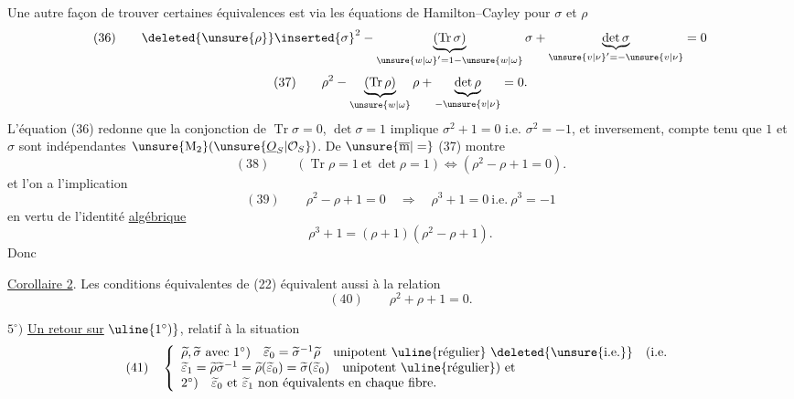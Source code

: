 Une autre façon de trouver certaines équivalences est via les équations de Hamilton--Cayley pour $\sigma$ et $\rho$
\[
(36)\qquad
\deleted{\unsure{\rho}}\inserted{\sigma}^2
-\underbrace{(\operatorname{Tr}\sigma)}_{\unsure{w|\omega}'=1-\unsure{w|\omega}}\sigma
+\underbrace{\det\sigma}_{\unsure{v|\nu}'=-\unsure{v|\nu}}=0
\]
\[
(37)\qquad
\rho^2-\underbrace{(\operatorname{Tr}\rho)}_\unsure{w|\omega}\rho
+\underbrace{\det\rho}_{-\unsure{v|\nu}}=0.
\]
L'équation (36) redonne que la conjonction de $\operatorname{Tr}\sigma=0$, $\det\sigma=1$ implique $\sigma^2+1=0$ i.e. $\sigma^2=-1$, et inversement, compte tenu que $1$ et $\sigma$ sont   indépendantes  $\unsure{\mathrm{M}_2}(\unsure{\underline{O}_S|\mathcal O_S})$.
De $\unsure{\overline{\mathrm m}|=}$ (37) montre
\[
(38)\qquad
(\operatorname{Tr}\rho=1\ \text{et}\ \det\rho=1)
\Longleftrightarrow(\rho^2-\rho+1=0).
\]
et l'on  a l'implication
\[
(39)\qquad
\rho^2-\rho+1=0\quad\Longrightarrow\quad
\rho^3+1=0\ \text{i.e.}\ \rho^3=-1
\]
en vertu de l'identité \uline{algébrique}
\[
\rho^3+1=(\rho+1)(\rho^2-\rho+1).
\]
Donc

\uline{Corollaire 2}. Les conditions équivalentes de (22) équivalent aussi à la relation
\[
(40)\qquad \rho^2+\rho+1=0.
\]




$5^\circ)$ \uline{Un retour sur} $\uline{1^\circ)}$, relatif à la situation
\[
(41)\quad
\left\{\begin{array}{l}
\widetilde\rho,\widetilde\sigma\ \text{avec }1^\circ)\quad
\widetilde\varepsilon_0=\widetilde\sigma^{-1}\widetilde\rho\quad
\text{unipotent }\uline{\text{régulier}}\ \deleted{\text{\unsure{i.e.}}}\quad(\text{i.e.}\\
\widetilde\varepsilon_1=\widetilde\rho\widetilde\sigma^{-1}
=\widetilde\rho(\widetilde\varepsilon_0)
=\widetilde\sigma(\widetilde\varepsilon_0)\quad
\text{unipotent }\uline{\text{régulier}})\ \text{et}\\
2^\circ)\quad\widetilde\varepsilon_0\ \text{et}\ \widetilde\varepsilon_1\ \text{non équivalents en chaque fibre.}
\end{array}\right.
\]

